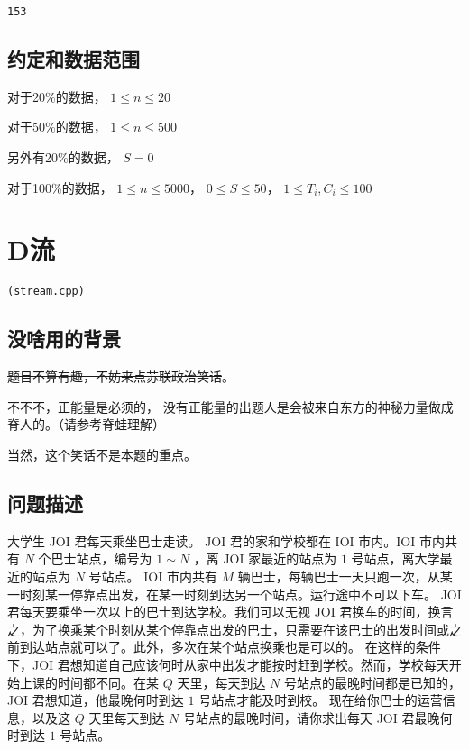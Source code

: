 \documentclass[UTF8]{ctexart}
\begin{document}
\begin{lstlisting}
153
\end{lstlisting}


\subsection{约定和数据范围}

对于20\%的数据， $1\le n\le 20$

对于50\%的数据， $1\le n\le 500$

另外有20\%的数据， $S=0$

对于100\%的数据， $1\le n\le 5000$， $0\le S\le 50$， $1\le T_i,C_i\le 100$

\newpage
\section{D流}
\begin{center}
\tt\large{(stream.cpp)}
\end{center}

\subsection{没啥用的背景}

\sout{题目不算有趣，不妨来点苏联政治笑话}。

不不不，正能量是必须的， 没有正能量的出题人是会被来自东方的神秘力量做成脊人的。（请参考脊蛙理解）

当然，这个笑话不是本题的重点。

\subsection{问题描述}

大学生 JOI 君每天乘坐巴士走读。
JOI 君的家和学校都在 IOI 市内。IOI 市内共有 $N$ 个巴士站点，编号为 $1\sim N$ ，离 JOI 家最近的站点为 $1$ 号站点，离大学最近的站点为 $N$ 号站点。
IOI 市内共有 $M$ 辆巴士，每辆巴士一天只跑一次，从某一时刻某一停靠点出发，在某一时刻到达另一个站点。运行途中不可以下车。
JOI 君每天要乘坐一次以上的巴士到达学校。我们可以无视 JOI 君换车的时间，换言之，为了换乘某个时刻从某个停靠点出发的巴士，只需要在该巴士的出发时间或之前到达站点就可以了。此外，多次在某个站点换乘也是可以的。
在这样的条件下，JOI 君想知道自己应该何时从家中出发才能按时赶到学校。然而，学校每天开始上课的时间都不同。在某 $Q$ 天里，每天到达 $N$ 号站点的最晚时间都是已知的，JOI 君想知道，他最晚何时到达 $1$ 号站点才能及时到校。
现在给你巴士的运营信息，以及这 $Q$ 天里每天到达 $N$ 号站点的最晚时间，请你求出每天 JOI 君最晚何时到达 $1$ 号站点。
\end{document}
